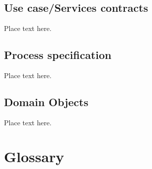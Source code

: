 \documentclass[12pt]{article}
\begin{document}
		\subsection{Use case/Services contracts}	
					    Place text here.		
					    
		\subsection{Process specification}	
					    Place text here.
					    
		\subsection{Domain Objects}	
					    Place text here.
					    
	\section{Glossary}					    			    			    		
\end{document}
